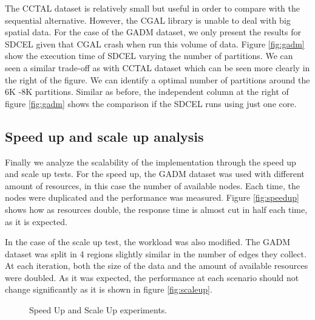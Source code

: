 The CCTAL dataset is relatively small but useful in order to compare with the sequential alternative.  However, the CGAL library is unable to deal with big spatial data.  For the case of the GADM dataset, we only present the results for SDCEL given that CGAL crash when run this volume of data.  Figure \ref{fig:gadm} show the execution time of SDCEL varying the number of partitions.  We can seen a similar trade-off as with CCTAL dataset which can be seen more clearly in the right of the figure.  We can identify a optimal number of partitions around the 6K -8K partitions.  Similar as before, the independent column at the right of figure \ref{fig:gadm} shows the comparison if the SDCEL runs using just one core.

\subsection{Speed up and scale up analysis}

Finally we analyze the scalability of the implementation through the speed up and scale up tests.  For the speed up, the GADM dataset was used with different amount of resources, in this case the number of available nodes.  Each time, the nodes were duplicated and the performance was measured.  Figure \ref{fig:speedup} shows  how as resources double, the response time is almost cut in half each time, as it is expected.  

In the case of the scale up test, the workload was also modified.  The GADM dataset was split in 4 regions slightly similar in the number of edges they collect.  At each iteration, both the size of the data and the amount of available resources were doubled. As it was expected, the performance at each scenario should not change significantly as it is shown in figure \ref{fig:scaleup}.

\begin{figure}[!ht]
    \centering
    \hfill
    \caption{Speed Up and Scale Up experiments.} \label{fig:speed_scale} 
\end{figure}
